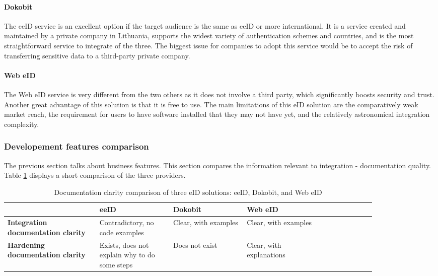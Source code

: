 \paragraph{Dokobit}

The eeID service is an excellent option if the target audience is the same as eeID or more international. It is a service created and maintained by a private company in Lithuania, supports the widest variety of authentication schemes and countries, and is the most straightforward service to integrate of the three. The biggest issue for companies to adopt this service would be to accept the risk of transferring sensitive data to a third-party private company.

\paragraph{Web eID}

The Web eID service is very different from the two others as it does not involve a third party, which significantly boosts security and trust. Another great advantage of this solution is that it is free to use. The main limitations of this eID solution are the comparatively weak market reach, the requirement for users to have software installed that they may not have yet, and the relatively astronomical integration complexity.

\subsubsection{Developement features comparison}

The previous section talks about business features. This section compares the information relevant to integration - documentation quality. Table \ref{tbl:summary-comparison-docs} displays a short comparison of the three providers.

\begin{table}
    \centering
    \begin{tabular}{ >{\raggedright}p{0.25\linewidth} | >{\raggedright}p{0.2\linewidth} | >{\raggedright}p{0.2\linewidth} | >{\raggedright}p{0.2\linewidth} p{0px}}
                                                   & \textbf{eeID}                                 & \textbf{Dokobit}     & \textbf{Web eID}         & \\
        \hline
        \textbf{Integration documentation clarity} & Contradictory, no code examples               & Clear, with examples & Clear, with examples     & \\
        \hline
        \textbf{Hardening documentation clarity}   & Exists, does not explain why to do some steps & Does not exist       & Clear, with explanations & \\
    \end{tabular}
    \caption{Documentation clarity comparison of three eID solutions: eeID, Dokobit, and Web eID}
    \label{tbl:summary-comparison-docs}
\end{table}

